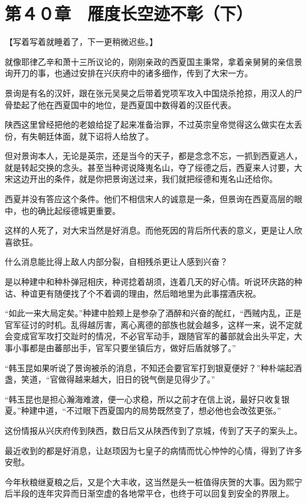 \section{第４０章　雁度长空迹不彰（下）}

【写着写着就睡着了，下一更稍微迟些。】

就像耶律乙辛和萧十三所议论的，刚刚亲政的西夏国主秉常，拿着亲舅舅的亲信景询开刀的事，也通过安排在兴庆府中的诸多细作，传到了大宋一方。

景询是有名的汉奸，跟在张元吴昊之后带着党项军攻入中国烧杀抢掠，用汉人的尸骨垫起了他在西夏国中的地位，是西夏国中数得着的汉臣代表。

陕西这里曾经把他的老娘给捉了起来准备治罪，不过英宗皇帝觉得这么做实在太丢份，有失朝廷体面，就下诏将人给放了。

但对景询本人，无论是英宗，还是当今的天子，都是念念不忘，一抓到西夏逃人，就是转起交换的念头。甚至当种谔说降嵬名山，夺了绥德之后，西夏来人讨要，大宋这边开出的条件，就是你把景询送过来，我们就把绥德和嵬名山还给你。

西夏并没有答应这个条件。他们不相信宋人的诚意是一条，但景询在西夏高层的眼中，也的确比起绥德城更重要。

这样的人死了，对大宋当然是好消息。而他死因的背后所代表的意义，更是让人欣喜欲狂。

什么消息能比得上敌人内部分裂，自相残杀更让人感到兴奋？

是以种建中和种朴弹冠相庆，种谔捻着胡须，连着几天的好心情。听说环庆路的种诂、种谊更有随便找了个不着调的理由，然后暗地里为此事摆酒庆祝。

“如此一来大局定矣。”种建中脸颊上是参杂了酒醉和兴奋的酡红，“西贼内乱，正是官军征讨的时机。乱得越厉害，离心离德的部族也就会越多，这样一来，说不定就会变成官军攻打交趾时的情况，不必官军动手，跟随官军的蕃部就会出头平定，大事小事都是由蕃部出手，官军只要坐镇后方，做好后盾就够了。”

“韩玉昆如果听说了景询被杀的消息，不知还会要官军打到银夏便好？”种朴端起酒盏，笑道，“官做得越来越大，旧日的锐气倒是见得少了。”

“韩玉昆也是担心瀚海难渡，便一心求稳，所以之前才在信上说，最好只收复银夏。”种建中道，“不过眼下西夏国内的局势既然变了，想必他也会改弦更张。”

这份情报从兴庆府传到陕西，数日后又从陕西传到了京城，传到了天子的案头上。

最近收到的都是好消息，让赵顼因为七皇子的病情而忧心忡忡的心情，得到了许多安慰。

今年秋粮继夏粮之后，又是个大丰收，这当然是头一桩值得庆贺的大事。因为熙宁后半段的连年灾异而日渐空虚的各地常平仓，也终于可以回复到安全的界限上。

